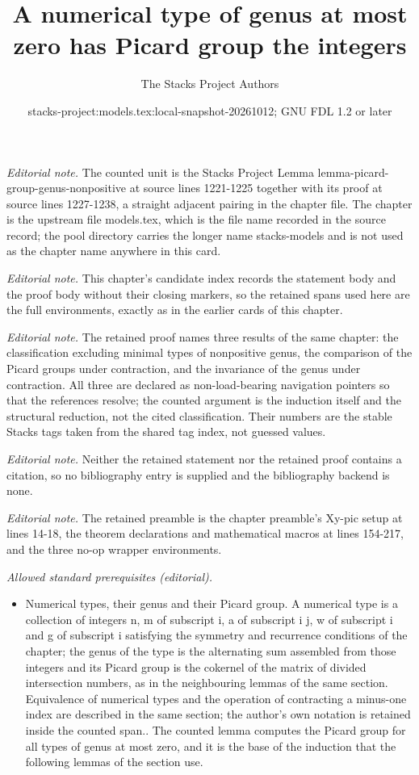 \documentclass[10pt,a4paper]{amsart}
\title{A numerical type of genus at most zero has Picard group the integers}
\author{The Stacks Project Authors}
\date{stacks-project:models.tex:local-snapshot-20261012; GNU FDL 1.2 or later}
\theoremstyle{plain}
\theoremstyle{definition}
\theoremstyle{remark}
\numberwithin{equation}{subsection}
\begin{document}
\maketitle
\noindent\textit{Editorial note.} The counted unit is the Stacks Project Lemma lemma-picard-group-genus-nonpositive at source lines 1221-1225 together with its proof at source lines 1227-1238, a straight adjacent pairing in the chapter file. The chapter is the upstream file models.tex, which is the file name recorded in the source record; the pool directory carries the longer name stacks-models and is not used as the chapter name anywhere in this card.\par\medskip
\noindent\textit{Editorial note.} This chapter's candidate index records the statement body and the proof body without their closing markers, so the retained spans used here are the full environments, exactly as in the earlier cards of this chapter.\par\medskip
\noindent\textit{Editorial note.} The retained proof names three results of the same chapter: the classification excluding minimal types of nonpositive genus, the comparison of the Picard groups under contraction, and the invariance of the genus under contraction. All three are declared as non-load-bearing navigation pointers so that the references resolve; the counted argument is the induction itself and the structural reduction, not the cited classification. Their numbers are the stable Stacks tags taken from the shared tag index, not guessed values.\par\medskip
\noindent\textit{Editorial note.} Neither the retained statement nor the retained proof contains a citation, so no bibliography entry is supplied and the bibliography backend is none.\par\medskip
\noindent\textit{Editorial note.} The retained preamble is the chapter preamble's Xy-pic setup at lines 14-18, the theorem declarations and mathematical macros at lines 154-217, and the three no-op wrapper environments.\par\medskip
\noindent\textit{Allowed standard prerequisites (editorial).}\begin{itemize}
\item Numerical types, their genus and their Picard group. A numerical type is a collection of integers n, m of subscript i, a of subscript i j, w of subscript i and g of subscript i satisfying the symmetry and recurrence conditions of the chapter; the genus of the type is the alternating sum assembled from those integers and its Picard group is the cokernel of the matrix of divided intersection numbers, as in the neighbouring lemmas of the same section. Equivalence of numerical types and the operation of contracting a minus-one index are described in the same section; the author's own notation is retained inside the counted span.. The counted lemma computes the Picard group for all types of genus at most zero, and it is the base of the induction that the following lemmas of the section use.
\end{itemize}\medskip
\end{document}
